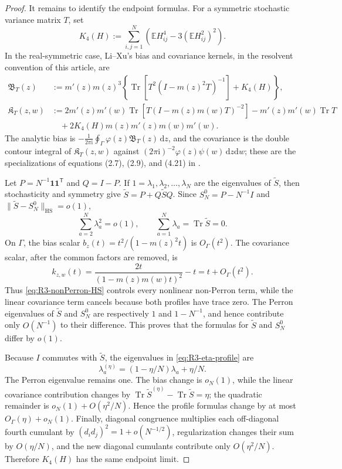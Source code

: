 \documentclass[10pt,a4paper]{amsart}
\newcommand{\E}{\mathbb E}
\newcommand{\Tr}{\operatorname{Tr}}
\newcommand{\ii}{\mathrm i}
\newcommand{\dd}{\mathrm d}
\newcommand{\HS}{\mathrm{HS}}
\newcommand{\one}{\mathbf 1}
\newcommand{\norm}[1]{\lVert #1\rVert}
\begin{document}
\begin{proof}
It remains to identify the endpoint formulas.  For a symmetric stochastic
variance matrix \(T\), set
\begin{equation}\label{eq:R3-LiXu-k4}
 K_4(H):=\sum_{i,j=1}^N
 \left(\E H_{ij}^4-3(\E H_{ij}^2)^2\right).
\end{equation}
In the real-symmetric case, Li--Xu's bias and covariance kernels, in the
resolvent convention of this article, are
\begin{align}
 \mathfrak B_T(z)
 &:=m'(z)m(z)^3
 \left\{\Tr\!\left[T^2(I-m(z)^2T)^{-1}\right]+K_4(H)\right\},
 \label{eq:R3-LiXu-bias-kernel}\\
 \mathfrak K_T(z,w)
 &:=2m'(z)m'(w)
 \Tr\!\left[T(I-m(z)m(w)T)^{-2}\right]
 -m'(z)m'(w)\Tr T\nonumber\\
 &\quad+2K_4(H)m(z)m'(z)m(w)m'(w).
 \label{eq:R3-LiXu-cov-kernel}
\end{align}
The analytic bias is
\(-\frac1{2\pi\ii}\oint_\Gamma\varphi(z)\mathfrak B_T(z)\,\dd z\),
and the covariance is the double contour integral of
\(\mathfrak K_T(z,w)\) against
\((2\pi\ii)^{-2}\varphi(z)\psi(w)\,\dd z\dd w\); these are the
specializations of equations (2.7), (2.9), and (4.21) in
\cite{LiXu2021GeneralizedWignerLES}.

Let \(P=N^{-1}\one\one^{\mathsf T}\) and \(Q=I-P\).  If
\(1=\lambda_1,\lambda_2,\ldots,\lambda_N\) are the eigenvalues of
\(\widetilde S\), then stochasticity and symmetry give
\(\widetilde S=P+Q\widetilde S Q\).  Since
\(S_N^0=P-N^{-1}I\) and
\(\norm{\widetilde S-S_N^0}_{\HS}=o(1)\),
\begin{equation}\label{eq:R3-nonPerron-HS}
 \sum_{a=2}^N\lambda_a^2=o(1),
 \qquad \sum_{a=1}^N\lambda_a=\Tr\widetilde S=0.
\end{equation}
On \(\Gamma\), the bias scalar
\(b_z(t)=t^2/(1-m(z)^2t)\) is \(O_\Gamma(t^2)\).  The covariance scalar,
after the common factors are removed, is
\[
 k_{z,w}(t)=\frac{2t}{(1-m(z)m(w)t)^2}-t
 =t+O_\Gamma(t^2).
\]
Thus \eqref{eq:R3-nonPerron-HS} controls every nonlinear non-Perron term,
while the linear covariance term cancels because both profiles have trace
zero.  The Perron eigenvalues of \(\widetilde S\) and \(S_N^0\) are
respectively \(1\) and \(1-N^{-1}\), and hence contribute only \(O(N^{-1})\)
to their difference.  This proves that the formulas for \(\widetilde S\)
and \(S_N^0\) differ by \(o(1)\).

Because \(I\) commutes with \(\widetilde S\), the eigenvalues in
\eqref{eq:R3-eta-profile} are
\[
 \lambda_a^{(\eta)}=(1-\eta/N)\lambda_a+\eta/N.
\]
The Perron eigenvalue remains one.  The bias change is \(o_N(1)\), while the
linear covariance contribution changes by
\(\Tr\widetilde S^{(\eta)}-\Tr\widetilde S=\eta\); the quadratic remainder
is \(o_N(1)+O(\eta^2/N)\).  Hence the profile formulas change by at most
\(O_\Gamma(\eta)+o_N(1)\).  Finally, diagonal congruence multiplies each
off-diagonal fourth cumulant by \((d_id_j)^2=1+o(N^{-1/2})\), regularization
changes their sum by \(O(\eta/N)\), and the new diagonal cumulants contribute
only \(O(\eta^2/N)\).  Therefore \(K_4(H)\) has the same endpoint limit.


\end{proof}
\end{document}
